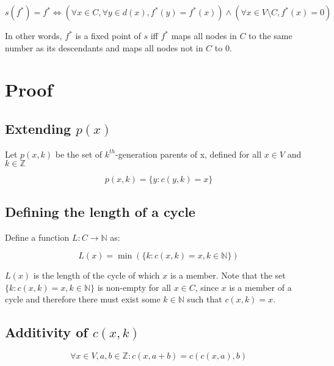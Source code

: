 \documentclass[11pt]{article}
\begin{document}
    \begin{equation}
        s(f^*) = f^* \Leftrightarrow (\forall x\in C, \forall y\in d(x), f^*(y) = f^*(x) ) \land (\forall x\in V\setminus C, f^*(x) = 0)
        \label{theorem_statement}
    \end{equation}

    In other words, $f^*$ is a fixed point of $s$ iff $f^*$ maps all nodes in $C$ to the same number as its descendants and maps all nodes not in $C$ to $0$.

    \section{Proof}

    \subsection{Extending $p(x)$}

    Let $p(x,k)$ be the set of $k^{th}$-generation parents of x, defined for all $x \in V$ and $k \in \mathbb{Z}$

    \begin{equation}
        p(x,k) = \{y: c(y,k) = x\}
        \label{define_pxk}
    \end{equation}

    \subsection{Defining the length of a cycle}

    Define a function $L: C \rightarrow \mathbb{N}$ as:

    \begin{equation}
        L(x) = \min ( \{k : c(x,k) = x, k \in \mathbb{N}\} )
        \label{define_Lx}
    \end{equation}

    $L(x)$ is the length of the cycle of which $x$ is a member. Note that the set $\{k : c(x,k) = x, k \in \mathbb{N}\}$ is non-empty for all $x \in C$, since $x$ is a member of a cycle and therefore there must exist some $k \in \mathbb{N}$ such that $c(x,k) = x$.

    \subsection{Additivity of $c(x,k)$}

    \begin{equation}
        \forall x \in V, a,b \in \mathbb{Z}: c(x, a+b) = c(c(x,a),b)
        \label{additivity_cxk}
    \end{equation}
\end{document}
